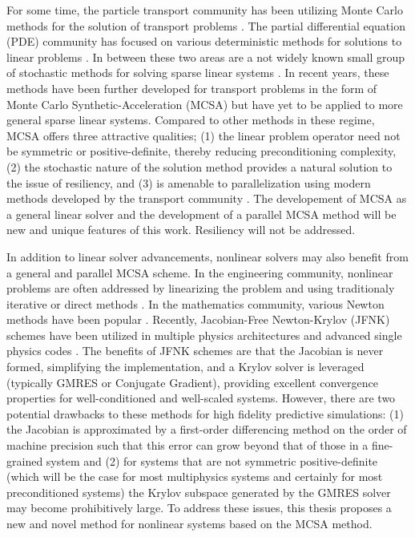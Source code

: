 For some time, the particle transport community has been utilizing
Monte Carlo methods for the solution of transport problems
\cite{lewis_1993}. The partial differential equation (PDE) community
has focused on various deterministic methods for solutions to linear
problems \cite{saad_2003}. In between these two areas are a not widely
known small group of stochastic methods for solving sparse linear
systems \cite{hammersley_1964, halton_1962, halton_1994}. In recent
years, these methods have been further developed for transport
problems in the form of Monte Carlo Synthetic-Acceleration (MCSA)
\cite{evans_2003, evans_2009} but have yet to be applied to more
general sparse linear systems. Compared to other methods in these
regime, MCSA offers three attractive qualities; (1) the linear problem
operator need not be symmetric or positive-definite, thereby reducing
preconditioning complexity, (2) the stochastic nature of the
solution method provides a natural solution to the issue of resiliency,
and (3) is amenable to parallelization using modern methods developed by
the transport community \cite{wagner_2011}. The developement of MCSA
as a general linear solver and the development of a parallel MCSA
method will be new and unique features of this work. Resiliency will
not be addressed.

In addition to linear solver advancements, nonlinear solvers may also
benefit from a general and parallel MCSA scheme. In the engineering
community, nonlinear problems are often addressed by linearizing the
problem and using traditionaly iterative or direct methods
\cite{tannehill_1997}. In the mathematics community, various Newton
methods have been popular \cite{kelley_1995}. Recently, Jacobian-Free
Newton-Krylov (JFNK) schemes \cite{knoll_2004} have been utilized in
multiple physics architectures and advanced single physics codes
\cite{gaston_2009}. The benefits of JFNK schemes are that the Jacobian
is never formed, simplifying the implementation, and a Krylov solver
is leveraged (typically GMRES or Conjugate Gradient), providing
excellent convergence properties for well-conditioned and well-scaled
systems. However, there are two potential drawbacks to these methods
for high fidelity predictive simulations: (1) the Jacobian is
approximated by a first-order differencing method on the order of
machine precision such that this error can grow beyond that of those
in a fine-grained system and (2) for systems that are not symmetric
positive-definite (which will be the case for most multiphysics
systems and certainly for most preconditioned systems) the Krylov
subspace generated by the GMRES solver may become prohibitively
large. To address these issues, this thesis proposes a new and novel
method for nonlinear systems based on the MCSA method.

